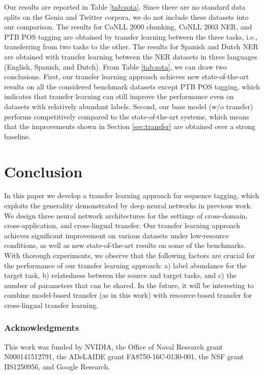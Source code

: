 \documentclass{article} \usepackage{iclr2017_conference,times}
\begin{document}
Our results are reported in Table \ref{tab:sota}. Since there are no standard data splits on the Genia and Twitter corpora, we do not include these datasets into our comparison. The results for CoNLL 2000 chunking, CoNLL 2003 NER, and PTB POS tagging are obtained by transfer learning between the three tasks, i.e., transferring from two tasks to the other. The results for Spanish and Dutch NER are obtained with transfer learning between the NER datasets in three languages (English, Spanish, and Dutch).
From Table \ref{tab:sota}, we can draw two conclusions. First, our transfer learning approach achieves new state-of-the-art results on all the considered benchmark datasets except PTB POS tagging, which indicates that transfer learning can still improve the performance even on datasets with relatively abundant labels. Second, our base model (w/o transfer) performs competitively compared to the state-of-the-art systems, which means that the improvements shown in Section \ref{sec:transfer} are obtained over a strong baseline.



 
\section{Conclusion}
In this paper we develop a transfer learning approach for sequence tagging, which exploits the generality demonstrated by deep neural networks in previous work. We design three neural network architectures
for the settings of cross-domain, cross-application, and cross-lingual transfer. Our transfer learning approach achieves significant improvement on various datasets under low-resource conditions, as well as new state-of-the-art results on some of the benchmarks. With thorough experiments, we observe that the following factors are crucial for the performance of our transfer learning approach: a) label abundance for the target task, b) relatedness between the source and target tasks, and c) the number of parameters that can be shared. In the future, it will be interesting to combine model-based transfer (as in this work) with resource-based transfer for cross-lingual transfer learning.




 
\subsubsection*{Acknowledgments}

This work was funded by NVIDIA, the Office of Naval Research grant N000141512791, the ADeLAIDE grant FA8750-16C-0130-001, the NSF grant IIS1250956, and Google Research.

\small



\end{document}
